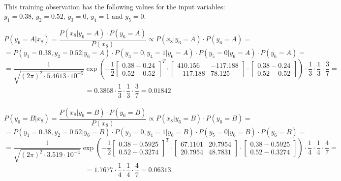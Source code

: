 \documentclass{article}
\begin{document}
\paragraph{}

This training observation has the following values for the input variables: $y_1=0.38$, $y_2=0.52$, $y_3=0$, $y_4=1$ and $y_5=0$.

\[ P(y_6=A|x_8) = \frac{P(x_8|y_6=A) \cdot P(y_6=A)}{P(x_8)} \propto P(x_8|y_6=A) \cdot P(y_6=A) = \]
\[ = P(y_1=0.38,y_2=0.52|y_6=A) \cdot P(y_3=0,y_4=1|y_6=A) \cdot P(y_5=0|y_6=A) \cdot P(y_6=A) = \]
\[ = \frac{1}{\sqrt{(2\pi)^2 \cdot 5.4613 \cdot 10^{-5}}} \exp \left( -\frac{1}{2} \left[ \begin{matrix} 0.38 - 0.24 \\ 0.52 - 0.52 \end{matrix} \right]^T \cdot \begin{bmatrix} 410.156 & -117.188 \\ -117.188 & 78.125 \end{bmatrix} \cdot \left[ \begin{matrix} 0.38 - 0.24 \\ 0.52 - 0.52 \end{matrix} \right] \right) \cdot \frac{1}{3} \cdot \frac{1}{3} \cdot \frac{3}{7} = \]
\[ = 0.3868 \cdot \frac{1}{3} \cdot \frac{1}{3} \cdot \frac{3}{7} = 0.01842 \]

\paragraph{}

\[ P(y_6=B|x_8) = \frac{P(x_8|y_6=B) \cdot P(y_6=B)}{P(x_8)} \propto P(x_8|y_6=B) \cdot P(y_6=B) = \]
\[ = P(y_1=0.38,y_2=0.52|y_6=B) \cdot P(y_3=0,y_4=1|y_6=B) \cdot P(y_5=0|y_6=B) \cdot P(y_6=B) = \]
\[ = \frac{1}{\sqrt{(2\pi)^2 \cdot 3.519 \cdot 10^{-4}}} \exp \left( -\frac{1}{2} \left[ \begin{matrix} 0.38 - 0.5925 \\ 0.52 - 0.3274 \end{matrix} \right]^T \cdot \begin{bmatrix} 67.1101 & 20.7954 \\ 20.7954 & 48.7831 \end{bmatrix} \cdot \left[ \begin{matrix} 0.38 - 0.5925 \\ 0.52 - 0.3274 \end{matrix} \right] \right) \cdot \frac{1}{4} \cdot \frac{1}{4} \cdot \frac{4}{7} = \]
\[ = 1.7677 \cdot \frac{1}{4} \cdot \frac{1}{4} \cdot \frac{4}{7} = 0.06313 \]
\end{document}
